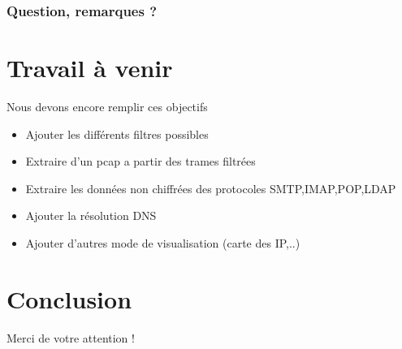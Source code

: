\documentclass{beamer}
\begin{document}

  \begin{frame}
    \frametitle{Question, remarques ?}
  \end{frame}

  \section{Travail à venir}
  \begin{frame}
    Nous devons encore remplir ces objectifs
    \begin{itemize}
     \item Ajouter les différents filtres possibles
     \item Extraire d'un pcap a partir des trames filtrées
     \item Extraire les données non chiffrées des protocoles SMTP,IMAP,POP,LDAP
     \item Ajouter la résolution DNS
     \item Ajouter d'autres mode de visualisation (carte des IP,..)
    \end{itemize}
  \end{frame}


  \section{Conclusion}
  \begin{frame}
    \begin{center}
      Merci de votre attention !
    \end{center}
  \end{frame}
\end{document}
